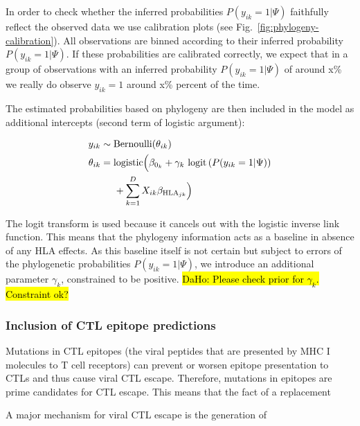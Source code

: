 \documentclass{bioinfo}
\begin{document}
\begin{methods}
In order to check whether the inferred probabilities \(P(y_{ik}=1|\Psi)\) faithfully reflect the observed data we use calibration plots (see Fig.~\ref{fig:phylogeny-calibration}). All observations are binned according to their inferred probability \(P(y_{ik}=1|\Psi)\). If these probabilities are calibrated correctly, we expect that in a group of observations with an inferred probability \(P(y_{ik}=1|\Psi)\) of around x\% we really do observe \(y_{ik}=1\) around x\% percent of the time.

The estimated probabilities based on phylogeny are then included in the model as additional intercepts (second term of logistic argument):

\begin{equation}
\begin{aligned}
  y_{ik}  & \sim \text{Bernoulli}(\theta_{ik}) \\
  \theta_{ik}  & =  \text{logistic}\Bigl(\beta_{0_{k}} + \gamma_k~\text{logit}\left(P(y_{ik}=1|\Psi)\right) \\
  &\;\;\;\;\; + \sum_{k=1}^{D}X_{ik}\beta_{\text{HLA}_{jk}}\Bigr)
  \label{eq:phylogeny}
\end{aligned}
\end{equation}

The logit transform is used because it cancels out with the logistic inverse link function. This means that the phylogeny information acts as a baseline in absence of any HLA effects. As this baseline itself is not certain but subject to errors of the phylogenetic probabilities $P(y_{ik}=1|\Psi)$, we introduce an additional parameter $\gamma_k$, constrained to be positive.
\hl{DaHo: Please check prior for $\gamma_k$. Constraint ok?}

\subsubsection{Inclusion of CTL epitope predictions}

Mutations in CTL epitopes (the viral peptides that are presented by MHC I molecules to T cell receptors) can prevent or worsen epitope presentation to CTLs and thus cause viral CTL escape. Therefore, mutations in epitopes are prime candidates for CTL escape. This means that the fact of a replacement 

A major mechanism for viral CTL escape is the generation of 


\end{methods}
\end{document}
